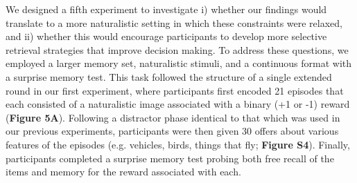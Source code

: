 \documentclass[10pt,letterpaper]{article}
\begin{document}
We designed a fifth experiment to investigate i) whether our findings would translate to a more naturalistic setting in which these constraints were relaxed, and ii) whether this would encourage participants to develop more selective retrieval strategies that improve decision making. To address these questions, we employed a larger memory set, naturalistic stimuli, and a continuous format with a surprise memory test. This task followed the structure of a single extended round in our first experiment, where participants first encoded 21 episodes that each consisted of a naturalistic image associated with a binary (+1 or -1) reward (\textbf{Figure 5A}). Following a distractor phase identical to that which was used in our previous experiments, participants were then given 30 offers about various features of the episodes (e.g. vehicles, birds, things that fly; \textbf{Figure S4}). Finally, participants completed a surprise memory test probing both free recall of the items and memory for the reward associated with each.
\end{document}
